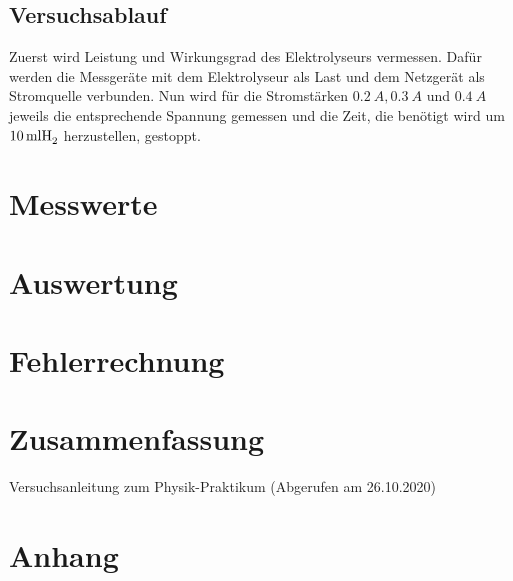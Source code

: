 \documentclass[a4paper,12pt,bibtotocnumbered]{scrartcl}
\numberwithin{equation}{section} %
\begin{document}
\subsection{Versuchsablauf}
Zuerst wird Leistung und Wirkungsgrad des Elektrolyseurs vermessen. Dafür werden die Messgeräte mit dem Elektrolyseur als Last und dem Netzgerät als Stromquelle verbunden. Nun wird für die Stromstärken $\SI{0,2}{A},\SI{0,3}{A}$ und $\SI{0,4}{A}$ jeweils die entsprechende Spannung gemessen und die Zeit, die benötigt wird um $\SI{10}{ml}\ce{H_2}$ herzustellen, gestoppt.

\section[Messwerte]{Messwerte}
\section[Auswertung]{Auswertung}
\section[Fehlerrechnung]{Fehlerrechnung}
\section[Zusammenfassung]{Zusammenfassung}
\begin{thebibliography}{999}
 Versuchsanleitung zum Physik-Praktikum (Abgerufen am 26.10.2020) 
\end{thebibliography}


\section{Anhang}

\end{document}

